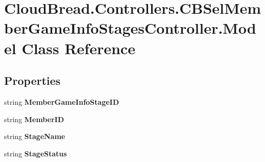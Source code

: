 \hypertarget{class_cloud_bread_1_1_controllers_1_1_c_b_sel_member_game_info_stages_controller_1_1_model}{}\section{Cloud\+Bread.\+Controllers.\+C\+B\+Sel\+Member\+Game\+Info\+Stages\+Controller.\+Model Class Reference}
\label{class_cloud_bread_1_1_controllers_1_1_c_b_sel_member_game_info_stages_controller_1_1_model}
\subsection*{Properties}
\begin{DoxyCompactItemize}
\item 
string {\bfseries Member\+Game\+Info\+Stage\+ID}\hypertarget{class_cloud_bread_1_1_controllers_1_1_c_b_sel_member_game_info_stages_controller_1_1_model_a984fd13e871ee3e04fc4a47912f53508}{}\label{class_cloud_bread_1_1_controllers_1_1_c_b_sel_member_game_info_stages_controller_1_1_model_a984fd13e871ee3e04fc4a47912f53508}

\item 
string {\bfseries Member\+ID}\hypertarget{class_cloud_bread_1_1_controllers_1_1_c_b_sel_member_game_info_stages_controller_1_1_model_a7da9c1fce273606f908a5802f3ba9a15}{}\label{class_cloud_bread_1_1_controllers_1_1_c_b_sel_member_game_info_stages_controller_1_1_model_a7da9c1fce273606f908a5802f3ba9a15}

\item 
string {\bfseries Stage\+Name}\hypertarget{class_cloud_bread_1_1_controllers_1_1_c_b_sel_member_game_info_stages_controller_1_1_model_a846f2602b5898c968a6358b6c3bf2914}{}\label{class_cloud_bread_1_1_controllers_1_1_c_b_sel_member_game_info_stages_controller_1_1_model_a846f2602b5898c968a6358b6c3bf2914}

\item 
string {\bfseries Stage\+Status}\hypertarget{class_cloud_bread_1_1_controllers_1_1_c_b_sel_member_game_info_stages_controller_1_1_model_a8acf10a4d058dd8469231af01987a408}{}\label{class_cloud_bread_1_1_controllers_1_1_c_b_sel_member_game_info_stages_controller_1_1_model_a8acf10a4d058dd8469231af01987a408}


\end{DoxyCompactItemize}

